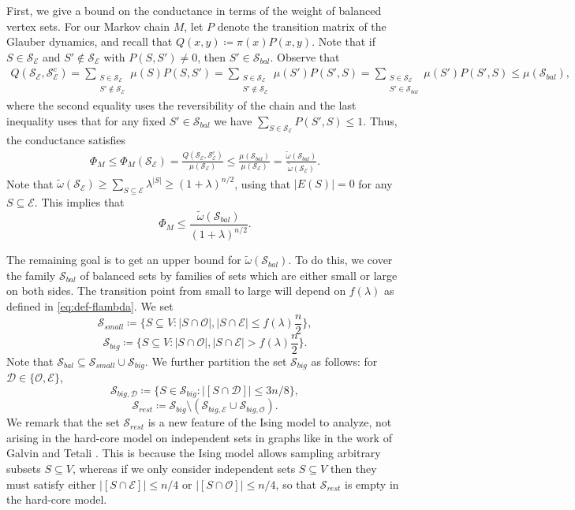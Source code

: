 \documentclass[reqno,a4paper,11pt]{amsart}
\newcommand{\cD}{\mathcal{D}}
\newcommand{\cE}{\mathcal{E}}
\newcommand{\cO}{\mathcal{O}}
\newcommand{\cS}{\mathcal{S}}
\newcommand{\lam}{\lambda}
\begin{document}
First, we give a bound on the conductance in terms of the weight of balanced vertex sets. For our Markov chain $M$, let $P$ denote the transition matrix of the Glauber dynamics, and recall that $Q(x,y) \coloneqq \pi(x)P(x,y)$. Note that if $S \in \cS_{\cE}$ and $S' \notin \cS_{\cE}$ with $P(S, S') \neq 0$, then $S' \in \cS_{bal}$. Observe that
\begin{align*}
    Q(\cS_{\cE}, \cS_{\cE}^c) = \sum_{\substack{S \in \cS_{\cE}\\ S' \notin \cS_{\cE}}} \mu(S) P(S, S') = \sum_{\substack{S \in \cS_{\cE}\\ S' \notin \cS_{\cE}}} \mu(S') P(S', S)= \sum_{\substack{S \in \cS_{\cE}\\ S' \in \cS_{bal}}} \mu(S') P(S', S) \leq \mu(\cS_{bal}),
\end{align*}
where the second equality uses the reversibility of the chain and the last inequality uses that for any fixed $S' \in \cS_{bal}$ we have $\sum_{S \in \cS_{\cE}} P(S', S) \leq 1$. Thus, the conductance satisfies
\begin{align*}
    \Phi_M \leq \Phi_M(\cS_{\cE}) = \frac{Q(\cS_{\cE}, \cS_{\cE}^c)}{\mu(\cS_{\cE})} \leq \frac{\mu(\cS_{bal})}{\mu(\cS_{\cE})} = \frac{\tilde{\omega}(\cS_{bal})}{\tilde{\omega}(\cS_{\cE})}.
\end{align*}
Note that $\tilde{\omega}(\cS_{\cE}) \geq \sum_{S \subseteq \cE} \lambda^{|S|} \geq (1+\lambda)^{n/2}$, using that $|E(S)|=0$ for any $S \subseteq \cE$. This implies that
\begin{equation} \label{eq:conductance_bound_weight_balanced}
    \Phi_M \leq \frac{\tilde{\omega}(\cS_{bal})}{(1+\lambda)^{n/2}}.
\end{equation}

The remaining goal is to get an upper bound for $\tilde{\omega}(\cS_{bal})$. To do this, we cover the family $\cS_{bal}$ of balanced sets by families of sets which are either small or large on both sides. The transition point from small to large will depend on $f(\lambda)$ as defined in \eqref{eq:def-flambda}. We set
\[
\cS_{small}  \coloneqq \{S \subseteq V : |S \cap \cO|, |S \cap \cE| \leq f(\lam)\frac{n}{2}\}, \]
\[
\cS_{big} \coloneqq \{S \subseteq V : |S \cap \cO|, |S \cap \cE| > f(\lam)\frac{n}{2}\}.
\]
Note that $\cS_{bal} \subseteq \cS_{small} \cup \cS_{big}$.
We further partition the set $\cS_{big}$ as follows: for $\cD \in \{\cO, \cE\}$,
\[
\cS_{big, \cD} \coloneqq \{S \in \cS_{big} : |[S \cap \cD]| \leq 3n/8\},
\]
\[
\cS_{rest} \coloneqq \cS_{big} \setminus (\cS_{big, \cE} \cup \cS_{big, \cO}).
\]
We remark that the set $\cS_{rest}$ is a new feature of the Ising model to analyze, not arising in the hard-core model on independent sets in graphs like in the work of Galvin and Tetali \cite{GaTe2006}. This is because the Ising model allows sampling arbitrary subsets $S \subseteq V$, whereas if we only consider independent sets $S \subseteq V$ then they must satisfy either $|[S \cap \cE]| \le n/4$ or $|[S \cap \cO]| \le n/4$, so that $\cS_{rest}$ is empty in the hard-core model.
\end{document}
